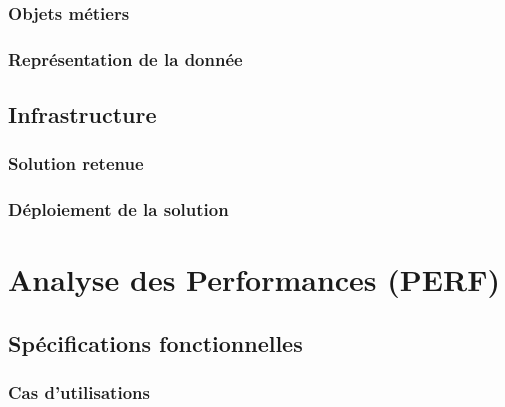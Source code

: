 \subsubsection{Objets métiers}


\subsubsection{Représentation de la donnée}


\subsection{Infrastructure}

\subsubsection{Solution retenue}


\subsubsection{Déploiement de la solution}


\section{Analyse des Performances (PERF)}%

\subsection{Spécifications fonctionnelles}

\subsubsection{Cas d’utilisations}

